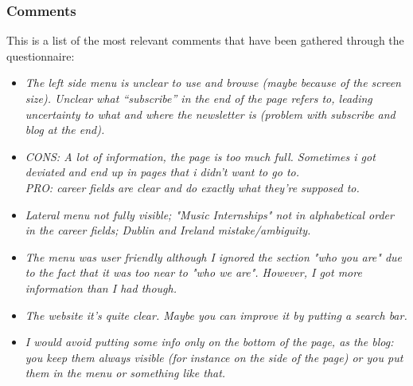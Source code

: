 \documentclass[11pt, letterpaper]{article}
\begin{document}
\subsubsection{Comments}
This is a list of the most relevant comments that have been gathered through the questionnaire: 
\begin{itemize}
    \item \textit{The left side menu is unclear to use and browse (maybe because of the screen size). Unclear what “subscribe” in the end of the page refers to, leading uncertainty to what and where the newsletter is (problem with subscribe and blog at the end). }
    \item \textit{CONS: A lot of information, the page is too much full. Sometimes i got deviated and end up in pages that i didn't want to go to. \\
    PRO: career fields are clear and do exactly what they're supposed to. } 
    \item \textit{Lateral menu not fully visible; "Music Internships" not in alphabetical order in the career fields; Dublin and Ireland mistake/ambiguity. }
    \item \textit{The menu was user friendly although I ignored the section "who you are" due to the fact that it was too near to "who we are". However, I got more information than I had though. }
    \item \textit{The website it's quite clear. Maybe you can improve it by putting a search bar. }
    \item \textit{I would avoid putting some info only on the bottom of the page, as the blog: you keep them always visible (for instance on the side of the page) or you put them in the menu or something like that. }
\end{itemize} 
 
\end{document}
